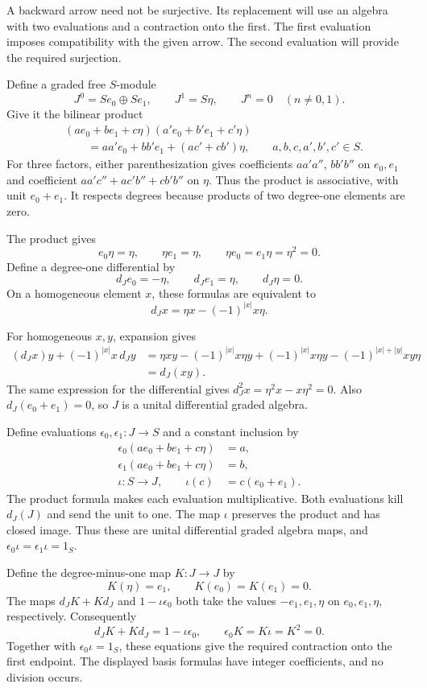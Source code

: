 A backward arrow need not be surjective. Its replacement will use
an algebra with two evaluations and a contraction onto the first.
The first evaluation imposes compatibility with the given arrow.
The second evaluation will provide the required surjection.

Define a graded free $S$-module
\[
 J^0=Se_0\oplus Se_1,\qquad J^1=S\eta,\qquad
 J^n=0\quad(n\ne0,1).
\]
Give it the bilinear product
\[
 \begin{split}
 &(ae_0+be_1+c\eta)(a'e_0+b'e_1+c'\eta)\\
 &\qquad=aa'e_0+bb'e_1+(ac'+cb')\eta,
 \qquad a,b,c,a',b',c'\in S.
 \end{split}
\]
For three factors, either parenthesization gives coefficients
$aa'a''$, $bb'b''$ on $e_0,e_1$ and coefficient
$aa'c''+ac'b''+cb'b''$ on $\eta$.
Thus the product is associative, with unit $e_0+e_1$.
It respects degrees because products of two degree-one elements are zero.

The product gives
\[
 e_0\eta=\eta,\qquad \eta e_1=\eta,\qquad
 \eta e_0=e_1\eta=\eta^2=0.
\]
Define a degree-one differential by
\[
 d_Je_0=-\eta,\qquad d_Je_1=\eta,\qquad d_J\eta=0.
\]
On a homogeneous element $x$, these formulas are equivalent to
\[
 d_Jx=\eta x-(-1)^{|x|}x\eta.
\]

For homogeneous $x,y$, expansion gives
\[
 \begin{split}
 (d_Jx)y+(-1)^{|x|}x\,d_Jy
 &=
 \eta xy-(-1)^{|x|}x\eta y
 +(-1)^{|x|}x\eta y
 -(-1)^{|x|+|y|}xy\eta\\
 &=d_J(xy).
 \end{split}
\]
The same expression for the differential gives
$d_J^2x=\eta^2x-x\eta^2=0$.
Also $d_J(e_0+e_1)=0$, so $J$ is a unital differential graded algebra.

Define evaluations $\epsilon_0,\epsilon_1:J\to S$ and a constant inclusion by
\[
 \begin{split}
 \epsilon_0(ae_0+be_1+c\eta)&=a,\\
 \epsilon_1(ae_0+be_1+c\eta)&=b,\\
 \iota:S\longrightarrow J,\qquad \iota(c)&=c(e_0+e_1).
 \end{split}
\]
The product formula makes each evaluation multiplicative.
Both evaluations kill $d_J(J)$ and send the unit to one.
The map $\iota$ preserves the product and has closed image.
Thus these are unital differential graded algebra maps, and
$\epsilon_0\iota=\epsilon_1\iota=1_S$.

Define the degree-minus-one map $K:J\to J$ by
\[
 K(\eta)=e_1,\qquad K(e_0)=K(e_1)=0.
\]
The maps $d_JK+Kd_J$ and $1-\iota\epsilon_0$ both take the values
$-e_1,e_1,\eta$ on $e_0,e_1,\eta$, respectively.
Consequently
\[
 d_JK+Kd_J=1-\iota\epsilon_0,\qquad
 \epsilon_0K=K\iota=K^2=0.
\]
Together with $\epsilon_0\iota=1_S$, these equations give the required
contraction onto the first endpoint.
The displayed basis formulas have integer coefficients, and no division occurs.


